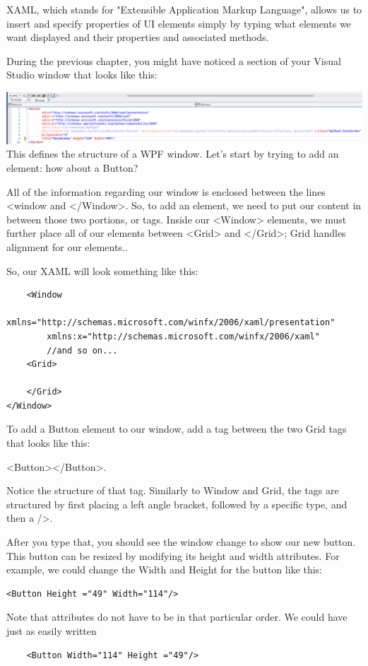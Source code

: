 \documentclass[oneside, openany] {book}
\begin{document}
XAML, which stands for "Extensible Application Markup Language", allows us to insert and specify properties of UI elements simply by typing what elements we want displayed and their properties and associated methods.

During the previous chapter, you might have noticed a section of your Visual Studio window that looks like this:


\includegraphics[scale=0.11]{XAMLIntro.png}
This defines the structure of a WPF window. Let's start by trying to add an element: how about a Button?

All of the information regarding our window is enclosed between the lines <window and </Window>. So, to add an element, we need to put our content in between those two portions, or tags. Inside our <Window> elements, we must further place all of our elements between <Grid> and </Grid>; Grid handles alignment for our elements..

So, our XAML will look something like this:

\begin{verbatim}
    <Window
        xmlns="http://schemas.microsoft.com/winfx/2006/xaml/presentation"
        xmlns:x="http://schemas.microsoft.com/winfx/2006/xaml"
        //and so on...
    <Grid>
    
    </Grid>
</Window>
\end{verbatim}
To add a Button element to our window, add a tag between the two Grid tags that looks like this:

<Button></Button>.

Notice the structure of that tag. Similarly to Window and Grid, the tags are structured by first placing a left angle bracket, followed by a specific type, and then a />.

After you type that, you should see the window change to show our new button. This button can be resized by modifying its height and width attributes. For example, we could change the Width and Height for the button like this:
\begin{verbatim}
<Button Height ="49" Width="114"/>
\end{verbatim}
Note that attributes do not have to be in that particular order. We could have just as easily written
\begin{verbatim}
    <Button Width="114" Height ="49"/>
\end{verbatim}
\end{document}
